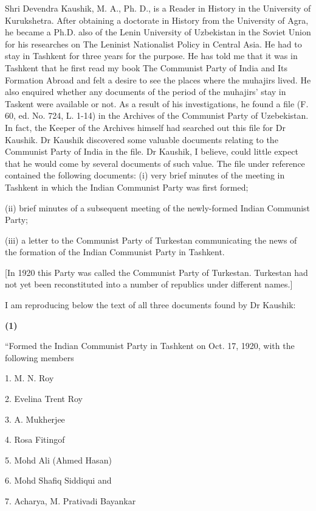 Shri Devendra Kaushik, M. A., Ph. D., is a Reader in History in the University of Kurukshetra. After obtaining a doctorate in History from the University of Agra, he became a Ph.D. also of the Lenin University of Uzbekistan in the Soviet Union for his researches on The Leninist Nationalist Policy in Central Asia. He had to stay in Tashkent for three years for the purpose. He has told me that it was in Tashkent that he first read my book The Communist Party of India and Its Formation Abroad and felt a desire to see the places where the muhajirs lived. He also enquired whether any documents of the period of the muhajirs’ stay in Taskent were available or not. As a result of his investigations, he found a file (F. 60, ed. No. 724, L. 1-14) in the Archives of the Communist Party of Uzebekistan. In fact, the Keeper of the Archives himself had searched out this file for Dr Kaushik. Dr Kaushik discovered some valuable documents relating to the Communist Party of India in the file. Dr Kaushik, I believe, could little expect that he would come by several documents of such value. The file under reference contained the following documents: 
(i) very brief minutes of the meeting in Tashkent in which the Indian Communist Party was first formed; 

(ii) brief minutes of a subsequent meeting of the newly-formed Indian Communist Party; 

(iii) a letter to the Communist Party of Turkestan communicating the news of the formation of the Indian Communist Party in Tashkent. 

[In 1920 this Party was called the Communist Party of Turkestan. Turkestan had not yet been reconstituted into a number of republics under different names.] 

I am reproducing below the text of all three documents found by Dr Kaushik: 

\begin{center}
    \textbf{(1)}
\end{center} 

“Formed the Indian Communist Party in Tashkent on Oct. 17, 1920, with the following members 

1. M. N. Roy 

2. Evelina Trent Roy 

3. A. Mukherjee 

4. Rosa Fitingof 

5. Mohd Ali (Ahmed Hasan) 

6. Mohd Shafiq Siddiqui and 

7. Acharya, M. Prativadi Bayankar 

